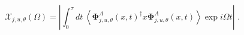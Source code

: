 \begin{equation}
\mathcal{X}_{j,u,\theta }(\Omega )=\left| \int_{0}^{\tau }dt\,\left\langle 
\mathbf{\Phi }_{j,u,\theta }^{A}(x,t)^{\dagger }x\mathbf{\Phi }_{j,u,\theta
}^{A}(x,t)\right\rangle \exp i\Omega t\right| \,\,.  \label{33}
\end{equation}

